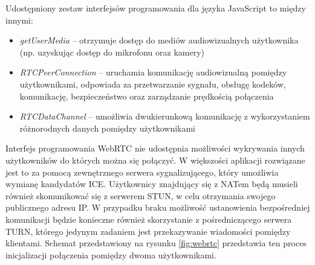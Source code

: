 \documentclass[language=polish,type=master]{aghmodern}
\begin{document}
Udostępniony zestaw interfejsów programowania dla języka JavaScript to między innymi:

\begin{itemize}
    \item \emph{getUserMedia} -- otrzymuje dostęp do mediów audiowizualnych użytkownika (np. uzyskując dostęp do mikrofonu oraz kamery)
    \item \emph{RTCPeerConnection} -- uruchamia komunikację audiowizualną pomiędzy użytkownikami, odpowiada za przetwarzanie sygnału, obsługę kodeków, komunikację, bezpieczeństwo oraz zarządzanie prędkością połączenia
    \item \emph{RTCDataChannel} -- umożliwia dwukierunkową komunikację z wykorzystaniem różnorodnych danych pomiędzy użytkownikami
\end{itemize}

Interfejs programowania WebRTC nie udostępnia możliwości wykrywania innych użytkowników do których można się połączyć.
W większości aplikacji rozwiązane jest to za pomocą zewnętrznego serwera sygnalizującego, który umożliwia wymianę kandydatów ICE\footnotemark{}.
Użytkownicy znajdujący się z NATem\footnotemark{} będą musieli również
skomunikować się z serwerem STUN\footnotemark{}, w celu otrzymania swojego publicznego adresu IP.
W przypadku braku możliwość ustanowienia bezpośredniej komunikacji będzie konieczne również skorzystanie z pośredniczącego serwera TURN\footnotemark{}, którego jedynym zadaniem jest przekazywanie wiadomości pomiędzy klientami.
Schemat przedstawiony na rysunku \ref{fig:webrtc} przedstawia ten proces inicjalizacji połączenia pomiędzy dwoma użytkownikami.
\end{document}
